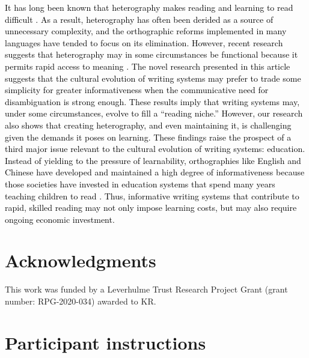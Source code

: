 \documentclass[doc,biblatex]{apa7}
\newcommand\firstrevision[1]{\textcolor{black}{#1}}
\begin{document}
\firstrevision{It has long been known that heterography makes reading and learning to read difficult \parencite{Pexman:2001, Seymour:2003}. As a result, heterography has often been derided as a source of unnecessary complexity, and the orthographic reforms implemented in many languages have tended to focus on its elimination. However, recent research suggests that heterography may in some circumstances be functional because it permits rapid access to meaning \parencite{Rastle:2019, Ulicheva:2020}. The novel research presented in this article suggests that the cultural evolution of writing systems may prefer to trade some simplicity for greater informativeness when the communicative need for disambiguation is strong enough. These results imply that writing systems may, under some circumstances, evolve to fill a “reading niche.” However, our research also shows that creating heterography, and even maintaining it, is challenging given the demands it poses on learning. These findings raise the prospect of a third major issue relevant to the cultural evolution of writing systems: education. Instead of yielding to the pressure of learnability, orthographies like English and Chinese have developed and maintained a high degree of informativeness because those societies have invested in education systems that spend many years teaching children to read \parencite[e.g.,][]{Xinchun:1999}. Thus, informative writing systems that contribute to rapid, skilled reading may not only impose learning costs, but may also require ongoing economic investment.}


\section{Acknowledgments}

\noindent This work was funded by a Leverhulme Trust Research Project Grant (grant number: RPG-2020-034) awarded to KR.

\printbibliography


\clearpage

\appendix


\section{Participant instructions}
\end{document}
